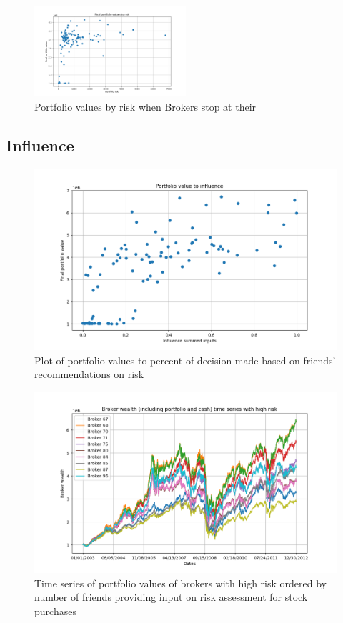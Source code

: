 \documentclass[letterpaper, 11 pt, proceedings]{IEEEtran}
\begin{document}
	\begin{figure}[h]
		\centering
		\includegraphics[width=0.5\textwidth]{valueToRisk_stopatstable.png}
		\caption{Portfolio values by risk when Brokers stop at their }
		\label{stopatstable}
	\end{figure}
	\FloatBarrier

	
	\subsection{Influence}
	
	\begin{figure}[h]
		\centering
		\includegraphics[width=.4\textwidth]{valueToInfluence_influence04.png}
		\caption{Plot of portfolio values to percent of decision made based on friends' recommendations on risk}
		\label{fig:value_to_influence_influencerun}
	\end{figure}	
	\FloatBarrier
	
	\begin{figure}[h]
		\centering
		\includegraphics[width=.4\textwidth]{timeSeriesJoint_influenceRun04_HighRisk.png}
		\caption{Time series of portfolio values of brokers with high risk ordered by number of friends providing input on risk assessment for stock purchases}
		\label{fig:high_risk_influence_time_series}
	\end{figure}	
	\FloatBarrier
\end{document}
